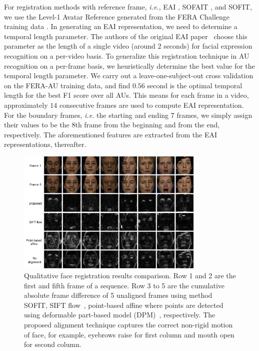 \documentclass[10pt,journal]{IEEEtran}
\begin{document}
For registration methods with reference frame, \textit{i.e.}, EAI \cite{Yang_SMCB12}, SOFAIT \cite{Yang_FG13}, and SOFIT, we use the Level-1 Avatar Reference \cite{Yang_SMCB12} generated from the FERA Challenge training data \cite{FERA11}. In generating an EAI representation, we need to determine a temporal length parameter. The authors of the original EAI paper~\cite{Yang_SMCB12} choose this parameter as the length of a single video (around $2$ seconds) for facial expression recognition on a per-video basis. To generalize this registration technique in AU recognition on a per-frame basis, we heuristically determine the best value for the temporal length parameter. We carry out a leave-one-subject-out cross validation on the FERA-AU training data, and find $0.56$ second is the optimal temporal length for the best F1 score over all AUs. This means for each frame in a video, approximately $14$ consecutive frames are used to compute EAI representation. For the boundary frames, \textit{i.e.} the starting and ending $7$ frames, we simply assign their values to be the $8$th frame from the beginning and from the end, respectively. The aforementioned features are extracted from the EAI representations, thereafter.

\begin{figure}[t]
	\centering
		\includegraphics[width=0.8\textwidth]{fig/fera_diff.png}
	\caption{Qualitative face registration results comparison. Row 1 and 2 are the first and fifth frame of a sequence. Row 3 to 5 are the cumulative absolute frame difference of 5 unaligned frames using method SOFIT, SIFT flow~\cite{Liu_PAMI11}, point-based affine where points are detected using deformable part-based model (DPM)~\cite{Zhu_CVPR12}, respectively. The proposed alignment technique captures the correct non-rigid motion of face, for example, eyebrows raise for first column and mouth open for second column.}
	\label{fig:fera_diff}
\end{figure}
\end{document}
